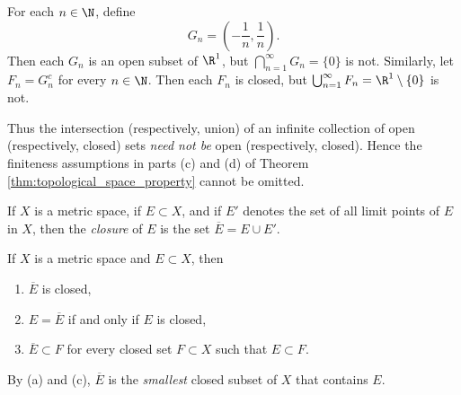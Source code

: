 \begin{example}
For each $n \in \N$, define
\[
G_n = \left(-\frac{1}{n},\frac{1}{n}\right).
\]
Then each $G_n$ is an open subset of $\R^1$, but $\bigcap_{n=1}^{\infty}G_n=\{0\}$ is not.
Similarly, let $F_n=G_n^c$ for every $n \in \N$. 
Then each $F_n$ is closed, but $\bigcup_{n=1}^{\infty}F_n=\R^1\setminus\{0\}$ is not.

Thus the intersection (respectively, union) of an infinite collection of open (respectively, closed) sets \emph{need not be} open (respectively, closed).
Hence the finiteness assumptions in parts (c) and (d) of Theorem \ref{thm:topological_space_property} cannot be omitted.
\end{example}

\begin{definition}
If $X$ is a metric space, if $E \subset X$, and if $E'$ denotes the set of all limit points of $E$ in $X$, then the \emph{closure} of $E$ is the set $\overline{E}=E\cup E'$.
\end{definition}
\begin{theorem}
If $X$ is a metric space and $E \subset X$, then
\begin{enumerate}
\item[(a)] $\overline{E}$ is closed,
\item[(b)] $E=\overline{E}$ if and only if $E$ is closed,
\item[(c)] $\overline{E} \subset F$ for every closed set $F \subset X$ such that $E \subset F$.   
\end{enumerate}
\end{theorem}
By (a) and (c), $\overline{E}$ is the \emph{smallest} closed subset of $X$ that contains $E$.
